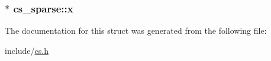 \hypertarget{structcs__sparse_a2dd17349e264aefa12ae346537dfa529}{
\subsubsection[{x}]{$\ast$ cs\-\_\-sparse\-::x}}\label{structcs__sparse_a2dd17349e264aefa12ae346537dfa529}


The documentation for this struct was generated from the following file\-:\begin{DoxyCompactItemize}
\item 
include/\hyperlink{cs_8h}{cs.\-h}\end{DoxyCompactItemize}
